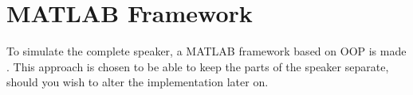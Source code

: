 
\chapter{MATLAB Framework}
To simulate the complete speaker, a MATLAB framework based on OOP is made \cite{MatlabClasses}. This approach is chosen to be able to keep the parts of the speaker separate, should you wish to alter the implementation later on.




%